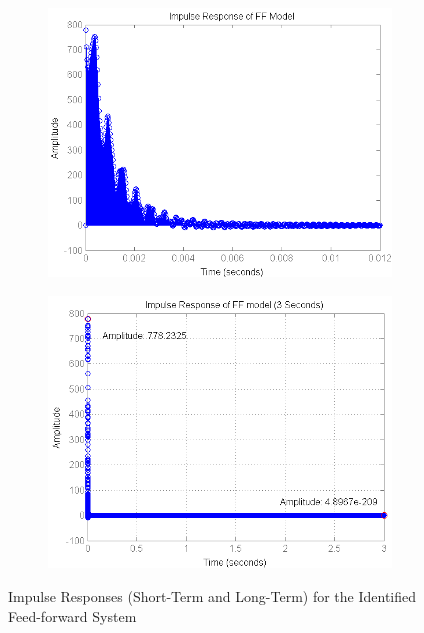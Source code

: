 \begin{figure}[h]
\centering
\begin{subfigure}[b]{0.5\textwidth}
\includegraphics[width=1.0\textwidth]{pics/impulse_FF}
\caption{}
\label{fig:impulse_FF}
\end{subfigure}\;\begin{subfigure}[b]{0.5\textwidth}
\includegraphics[width=1.0\textwidth]{pics/impulse_FF_3sec}
\caption{}
\label{fig:impulse_FF_3sec}
\end{subfigure}
\caption{Impulse Responses (Short-Term and Long-Term) for the Identified Feed-forward System}

\end{figure}

